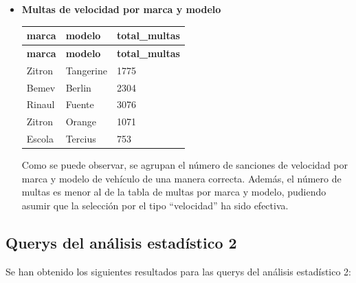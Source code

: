 \documentclass[]{article}
\begin{document}
\begin{itemize}
    \item \textbf{Multas de velocidad por marca y modelo}

\begin{table}[H]
\begin{longtable}{l l l}
    \hline
    \textbf{marca} & \textbf{modelo} & \textbf{total\_multas} \\ \hline
    \endfirsthead
    
    \hline
    \textbf{marca} & \textbf{modelo} & \textbf{total\_multas} \\ \hline
    \endhead
    
    Zitron & Tangerine & 1775 \\ \hline
    Bemev & Berlin & 2304 \\ \hline
    Rinaul & Fuente & 3076 \\ \hline
    Zitron & Orange & 1071 \\ \hline
    Escola & Tercius & 753 \\ \hline
\end{longtable}
\end{table}

Como se puede observar, se agrupan el número de sanciones de velocidad por marca y modelo de vehículo de una manera correcta. Además, el número de multas es menor al de la tabla de multas por marca y modelo, pudiendo asumir que la selección por el tipo ``velocidad'' ha sido efectiva.

\end{itemize}

\subsection{Querys del análisis estadístico 2}
Se han obtenido los siguientes resultados para las querys del análisis estadístico 2:
\end{document}
